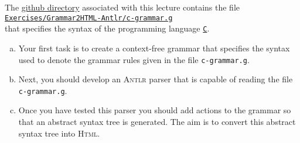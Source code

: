 \exerciseEng
The \href{https://github.com/karlstroetmann/Formal-Languages}{github directory} associated with this lecture
contains the file
\\[0.2cm]
\hspace*{1.3cm}
\href{https://github.com/karlstroetmann/Formal-Languages/tree/master/Exercises/Grammar2HTML-Antlr/c-grammar.g}{
\texttt{Exercises/Grammar2HTML-Antlr/c-grammar.g}}
\\[0.2cm]
that specifies the syntax of the programming language 
\href{https://en.wikipedia.org/wiki/C_(programming_language)}{\texttt{C}}.

\begin{enumerate}[(a)]
\item Your first task is to create a context-free grammar that specifies the syntax used to denote the grammar
      rules given in the file \texttt{c-grammar.g}.  
\item Next, you should develop an \textsc{Antlr} parser that is capable of reading the file
      \texttt{c-grammar.g}.
\item Once you have tested this parser you should add actions to the grammar
      so that an abstract syntax tree is generated.  The aim is to convert this abstract syntax tree
      into \textsc{Html}. 
\end{enumerate}

